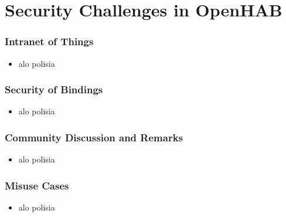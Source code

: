 \documentclass{beamer}
\begin{document}
\section{Security Challenges in OpenHAB}
\begin{frame}
\frametitle{Intranet of Things}
\begin{itemize}
  \setlength\itemsep{1.5em}
\item alo polisia
\end{itemize}
\end{frame}
\begin{frame}
\frametitle{Security of Bindings}
\begin{itemize}
  \setlength\itemsep{1.5em}
\item alo polisia
\end{itemize}
\end{frame}
\begin{frame}
\frametitle{Community Discussion and Remarks}
\begin{itemize}
  \setlength\itemsep{1.5em}
\item alo polisia
\end{itemize}
\end{frame}
\begin{frame}
\frametitle{Misuse Cases}
\begin{itemize}
  \setlength\itemsep{1.5em}
\item alo polisia
\end{itemize}
\end{frame}
\end{document}
